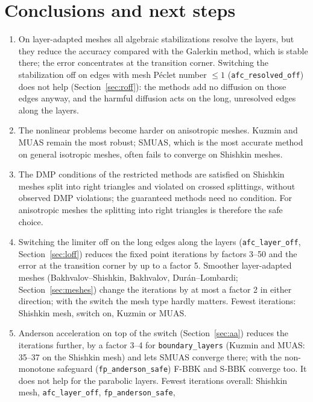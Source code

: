 \documentclass[11pt]{article}
\begin{document}
\section{Conclusions and next steps}

\begin{enumerate}[leftmargin=*]
\item On layer-adapted meshes all algebraic stabilizations resolve the layers, but they reduce the accuracy compared
  with the Galerkin method, which is stable there; the error concentrates at the transition corner. Switching the
  stabilization off on edges with mesh P\'eclet number $\le1$ (\texttt{afc\_resolved\_off}) does not help
  (Section~\ref{sec:roff}): the methods add no diffusion on those edges anyway, and the harmful diffusion acts on the
  long, unresolved edges along the layers.
\item The nonlinear problems become harder on anisotropic meshes. Kuzmin and MUAS remain the most robust; SMUAS, which
  is the most accurate method on general isotropic meshes, often fails to converge on Shishkin meshes.
\item The DMP conditions of the restricted methods are satisfied on Shishkin meshes split into right triangles and
  violated on crossed splittings, without observed DMP violations; the guaranteed methods need no condition. For
  anisotropic meshes the splitting into right triangles is therefore the safe choice.
\item Switching the limiter off on the long edges along the layers (\texttt{afc\_layer\_off},
  Section~\ref{sec:loff}) reduces the fixed point iterations by factors 3--50 and the error at the transition corner
  by up to a factor 5. Smoother layer-adapted meshes (Bakhvalov--Shishkin, Bakhvalov, Dur\'an--Lombardi;
  Section~\ref{sec:meshes}) change the iterations by at most a factor 2 in either direction; with the switch the mesh
  type hardly matters. Fewest iterations: Shishkin mesh, switch on, Kuzmin or MUAS.
\item Anderson acceleration on top of the switch (Section~\ref{sec:aa}) reduces the iterations further, by a factor 3--4
  for \texttt{boundary\_layers} (Kuzmin and MUAS: 35--37 on the Shishkin mesh) and lets SMUAS converge there; with
  the non-monotone safeguard (\texttt{fp\_anderson\_safe}) F-BBK and S-BBK converge too. It does not help for the
  parabolic layers. Fewest iterations overall: Shishkin mesh, \texttt{afc\_layer\_off}, \texttt{fp\_anderson\_safe},

\end{enumerate}
\end{document}
